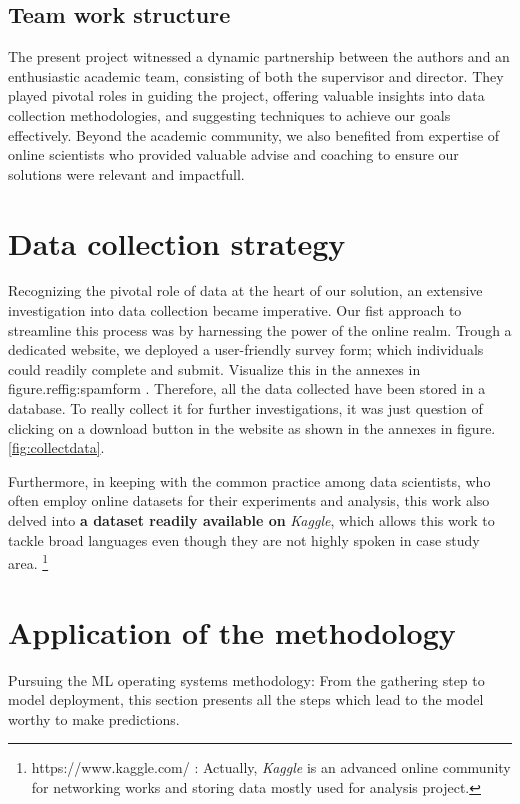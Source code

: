 \documentclass[12pt,a4paper, oneside]{book}
\begin{document}
\subsection{Team work structure} 
The present project witnessed a dynamic partnership between the authors and an enthusiastic academic team, consisting of both the supervisor and director. They played pivotal roles in guiding the project, offering valuable insights into data collection methodologies, and suggesting techniques to achieve our goals effectively. Beyond the academic community, we also benefited from expertise of online scientists who provided valuable advise and coaching to ensure our solutions were relevant and impactfull.

\section{Data collection strategy } 
Recognizing the pivotal role of data at the heart of our solution, an extensive investigation into data collection became imperative. Our fist approach to streamline this process was by harnessing the power of the online realm. Trough a dedicated website, we deployed a user-friendly survey form; which individuals could readily complete and submit. Visualize this in the annexes in figure.ref{fig:spamform} .
Therefore, all the data collected have been stored in a database. To really collect it for further investigations, it was just question of clicking on a download button in the website as shown in the annexes in figure.\ref{fig:collectdata}.

Furthermore, in keeping with the common practice among data scientists, who often employ online datasets for their experiments and analysis, this work also delved into \textbf{a dataset readily available on} \textit{Kaggle}, which allows this work to tackle broad languages even though they are not highly spoken in case study area. \footnote{https://www.kaggle.com/ : Actually, \textit{Kaggle} is an advanced online community for networking works and storing data mostly used for analysis project.} 

\section{Application of the methodology} 
Pursuing the ML operating systems methodology: From the gathering step to model deployment, this section presents all the steps which lead to the model worthy to make predictions. 
\end{document}
